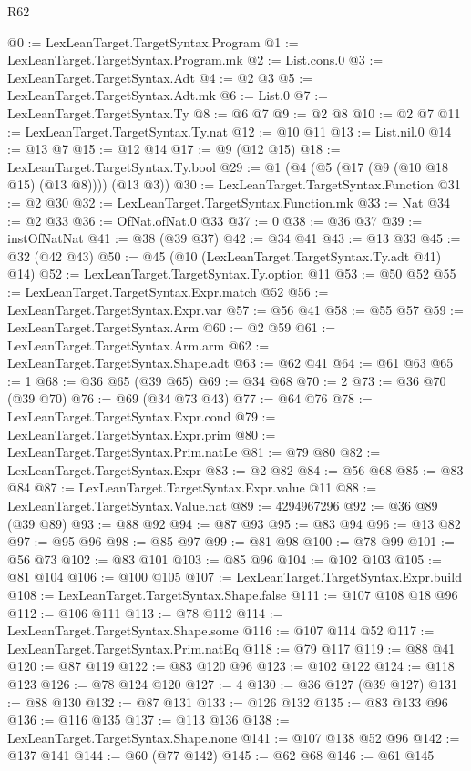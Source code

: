 \begin{lexlean}{R62}
\begin{coremodule}
@0 := LexLeanTarget.TargetSyntax.Program
@1 := LexLeanTarget.TargetSyntax.Program.mk
@2 := List.cons.{0}
@3 := LexLeanTarget.TargetSyntax.Adt
@4 := @2 @3
@5 := LexLeanTarget.TargetSyntax.Adt.mk
@6 := List.{0}
@7 := LexLeanTarget.TargetSyntax.Ty
@8 := @6 @7
@9 := @2 @8
@10 := @2 @7
@11 := LexLeanTarget.TargetSyntax.Ty.nat
@12 := @10 @11
@13 := List.nil.{0}
@14 := @13 @7
@15 := @12 @14
@17 := @9 (@12 @15)
@18 := LexLeanTarget.TargetSyntax.Ty.bool
@29 := @1 (@4 (@5 (@17 (@9 (@10 @18 @15) (@13 @8)))) (@13 @3))
@30 := LexLeanTarget.TargetSyntax.Function
@31 := @2 @30
@32 := LexLeanTarget.TargetSyntax.Function.mk
@33 := Nat
@34 := @2 @33
@36 := OfNat.ofNat.{0} @33
@37 := 0
@38 := @36 @37
@39 := instOfNatNat
@41 := @38 (@39 @37)
@42 := @34 @41
@43 := @13 @33
@45 := @32 (@42 @43)
@50 := @45 (@10 (LexLeanTarget.TargetSyntax.Ty.adt @41) @14)
@52 := LexLeanTarget.TargetSyntax.Ty.option @11
@53 := @50 @52
@55 := LexLeanTarget.TargetSyntax.Expr.match @52
@56 := LexLeanTarget.TargetSyntax.Expr.var
@57 := @56 @41
@58 := @55 @57
@59 := LexLeanTarget.TargetSyntax.Arm
@60 := @2 @59
@61 := LexLeanTarget.TargetSyntax.Arm.arm
@62 := LexLeanTarget.TargetSyntax.Shape.adt
@63 := @62 @41
@64 := @61 @63
@65 := 1
@68 := @36 @65 (@39 @65)
@69 := @34 @68
@70 := 2
@73 := @36 @70 (@39 @70)
@76 := @69 (@34 @73 @43)
@77 := @64 @76
@78 := LexLeanTarget.TargetSyntax.Expr.cond
@79 := LexLeanTarget.TargetSyntax.Expr.prim
@80 := LexLeanTarget.TargetSyntax.Prim.natLe
@81 := @79 @80
@82 := LexLeanTarget.TargetSyntax.Expr
@83 := @2 @82
@84 := @56 @68
@85 := @83 @84
@87 := LexLeanTarget.TargetSyntax.Expr.value @11
@88 := LexLeanTarget.TargetSyntax.Value.nat
@89 := 4294967296
@92 := @36 @89 (@39 @89)
@93 := @88 @92
@94 := @87 @93
@95 := @83 @94
@96 := @13 @82
@97 := @95 @96
@98 := @85 @97
@99 := @81 @98
@100 := @78 @99
@101 := @56 @73
@102 := @83 @101
@103 := @85 @96
@104 := @102 @103
@105 := @81 @104
@106 := @100 @105
@107 := LexLeanTarget.TargetSyntax.Expr.build
@108 := LexLeanTarget.TargetSyntax.Shape.false
@111 := @107 @108 @18 @96
@112 := @106 @111
@113 := @78 @112
@114 := LexLeanTarget.TargetSyntax.Shape.some
@116 := @107 @114 @52
@117 := LexLeanTarget.TargetSyntax.Prim.natEq
@118 := @79 @117
@119 := @88 @41
@120 := @87 @119
@122 := @83 @120 @96
@123 := @102 @122
@124 := @118 @123
@126 := @78 @124 @120
@127 := 4
@130 := @36 @127 (@39 @127)
@131 := @88 @130
@132 := @87 @131
@133 := @126 @132
@135 := @83 @133 @96
@136 := @116 @135
@137 := @113 @136
@138 := LexLeanTarget.TargetSyntax.Shape.none
@141 := @107 @138 @52 @96
@142 := @137 @141
@144 := @60 (@77 @142)
@145 := @62 @68
@146 := @61 @145

\end{coremodule}
\end{lexlean}
